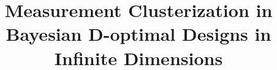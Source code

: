 \documentclass[ba]{imsart}
\begin{document}

\begin{frontmatter}
\title{Measurement Clusterization in Bayesian D-optimal Designs in Infinite Dimensions}


\begin{aug}
\author{ }

\address[addr1]{Azrieli Faculty of Medicine, Bar-Ilan University, Safed, Israel
}

\end{aug}

\begin{abstract}
  
\end{abstract}

\begin{keyword}[class=MSC]
\end{keyword}

\end{frontmatter}










\begin{acks}[Acknowledgments]


\end{acks}



\end{document}
